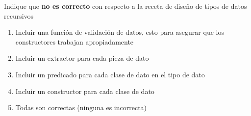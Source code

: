 {
Indique que \textbf{no es correcto} con respecto a la receta de diseño de tipos de datos recursivos
	\begin{enumerate}
		\item Incluir una función de validación de datos, esto para asegurar que los constructores trabajan apropiadamente %
		\item Incluir un extractor para cada pieza de dato
		\item Incluir un predicado para cada clase de dato en el tipo de dato
		\item Incluir un constructor para cada clase de dato
		\item Todas son correctas (ninguna es incorrecta)
	\end{enumerate}
}
